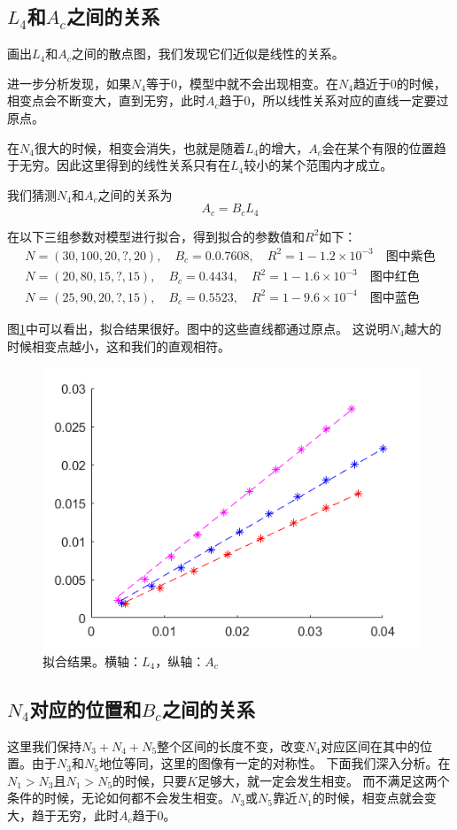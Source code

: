 \documentclass[12pt,a4paper]{article}
\begin{document}
\subsection{$L_4$和$A_c$之间的关系}

画出$L_4$和$A_c$之间的散点图，我们发现它们近似是线性的关系。

进一步分析发现，如果$N_4$等于0，模型中就不会出现相变。在$N_4$趋近于0的时候，相变点会不断变大，直到无穷，此时$A_c$趋于0，所以线性关系对应的直线一定要过原点。

在$N_4$很大的时候，相变会消失，也就是随着$L_4$的增大，$A_c$会在某个有限的位置趋于无穷。因此这里得到的线性关系只有在$L_4$较小的某个范围内才成立。

我们猜测$N_4$和$A_c$之间的关系为
$$ A_c = B_c L_4 $$

在以下三组参数对模型进行拟合，得到拟合的参数值和$R^2$如下：
\begin{align*}
N=(30, 100, 20, ?, 20), \quad B_c = 0.0.7608, \quad R^2 = 1 - 1.2 \times 10^{-3} \quad \text{图中紫色} \\
N=(20, 80, 15, ?, 15), \quad B_c = 0.4434, \quad R^2 = 1 - 1.6 \times 10^{-3} \quad \text{图中红色} \\
N=(25, 90, 20, ?, 15), \quad B_c = 0.5523, \quad R^2 = 1 - 9.6 \times 10^{-4} \quad \text{图中蓝色}
\end{align*}

图\ref{fn4}中可以看出，拟合结果很好。图中的这些直线都通过原点。
这说明$N_4$越大的时候相变点越小，这和我们的直观相符。
\begin{figure}[h]
\centering
\includegraphics[width=0.4\linewidth]{n4ac}
\caption{拟合结果。横轴：$L_4$，纵轴：$A_c$}
\label{fn4}
\end{figure}

\subsection{$N_4$对应的位置和$B_c$之间的关系}

这里我们保持$N_3+N_4+N_5$整个区间的长度不变，改变$N_4$对应区间在其中的位置。由于$N_3$和$N_5$地位等同，这里的图像有一定的对称性。
下面我们深入分析。在$N_1 > N_3$且$N_1 > N_5$的时候，只要$K$足够大，就一定会发生相变。
而不满足这两个条件的时候，无论如何都不会发生相变。$N_3$或$N_5$靠近$N_1$的时候，相变点就会变大，趋于无穷，此时$A_c$趋于0。
\end{document}

